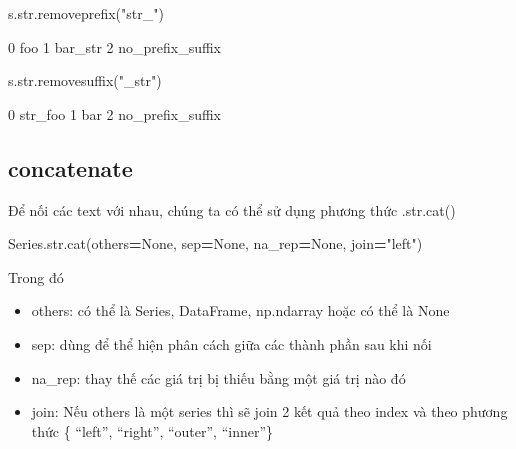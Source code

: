 \documentclass[
]{book}
\newenvironment{Shaded}{\begin{snugshade}}{\end{snugshade}}
\newcommand{\BuiltInTok}[1]{#1}
\newcommand{\NormalTok}[1]{#1}
\newcommand{\OperatorTok}[1]{\textcolor[rgb]{0.81,0.36,0.00}{\textbf{#1}}}
\newcommand{\StringTok}[1]{\textcolor[rgb]{0.31,0.60,0.02}{#1}}
\newcommand{\VariableTok}[1]{\textcolor[rgb]{0.00,0.00,0.00}{#1}}
\begin{document}
\begin{Shaded}
\begin{Highlighting}[]
\NormalTok{s.}\BuiltInTok{str}\NormalTok{.removeprefix(}\StringTok{"str\_"}\NormalTok{)​}
\end{Highlighting}
\end{Shaded}

\begin{Shaded}
\begin{Highlighting}[]
\NormalTok{0                 foo}
\NormalTok{1             bar\_str}
\NormalTok{2    no\_prefix\_suffix}
\end{Highlighting}
\end{Shaded}

\begin{Shaded}
\begin{Highlighting}[]
\NormalTok{s.}\BuiltInTok{str}\NormalTok{.removesuffix(}\StringTok{"\_str"}\NormalTok{)​}
\end{Highlighting}
\end{Shaded}

\begin{Shaded}
\begin{Highlighting}[]
\NormalTok{0             str\_foo}
\NormalTok{1                 bar}
\NormalTok{2    no\_prefix\_suffix}
\end{Highlighting}
\end{Shaded}

\subsection{concatenate}\label{concatenate}

Để nối các text với nhau, chúng ta có thể sử dụng phương thức .str.cat()\hspace{0pt}

\begin{Shaded}
\begin{Highlighting}[]
\NormalTok{Series.}\BuiltInTok{str}\NormalTok{.cat(others}\OperatorTok{=}\VariableTok{None}\NormalTok{, sep}\OperatorTok{=}\VariableTok{None}\NormalTok{, na\_rep}\OperatorTok{=}\VariableTok{None}\NormalTok{, join}\OperatorTok{=}\StringTok{"left"}\NormalTok{)}
\end{Highlighting}
\end{Shaded}

Trong đó\hspace{0pt}

\begin{itemize}
\item
  others: có thể là Series, DataFrame, np.ndarray hoặc có thể là None\hspace{0pt}
\item
  sep: dùng để thể hiện phân cách giữa các thành phần sau khi nối\hspace{0pt}
\item
  na\_rep: thay thế các giá trị bị thiếu bằng một giá trị nào đó\hspace{0pt}
\item
  join: Nếu others là một series thì sẽ join 2 kết quả theo index và theo phương thức \{ ``left'', ``right'', ``outer'', ``inner''\}\hspace{0pt}
\end{itemize}
\end{document}
